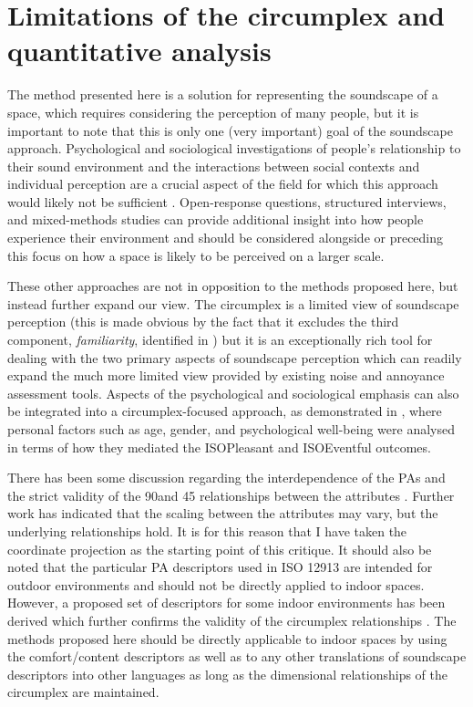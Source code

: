 \section{Limitations of the circumplex and quantitative analysis}
The method presented here is a solution for representing the soundscape of a space, which requires considering the perception of many people, but it is important to note that this is only one (very important) goal of the soundscape approach. Psychological and sociological investigations of people's relationship to their sound environment and the interactions between social contexts and individual perception are a crucial aspect of the field for which this approach would likely not be sufficient \citep{Bild2018Public}. Open-response questions, structured interviews, and mixed-methods studies can provide additional insight into how people experience their environment and should be considered alongside or preceding this focus on how a space is likely to be perceived on a larger scale.

These other approaches are not in opposition to the methods proposed here, but instead further expand our view. The circumplex is a limited view of soundscape perception (this is made obvious by the fact that it excludes the third component, \emph{familiarity}, identified in \citet{Axelsson2010principal}) but it is an exceptionally rich tool for dealing with the two primary aspects of soundscape perception which can readily expand the much more limited view provided by existing noise and annoyance assessment tools. Aspects of the psychological and sociological emphasis can also be integrated into a circumplex-focused approach, as demonstrated in \citet{Erfanian2021Psychological}, where personal factors such as age, gender, and psychological well-being were analysed in terms of how they mediated the ISOPleasant and ISOEventful outcomes.

There has been some discussion regarding the interdependence of the PAs and the strict validity of the 90\textdegree and 45 \textdegree relationships between the attributes \citep{Lionello2021Introducing}. Further work has indicated that the scaling between the attributes may vary, but the underlying relationships hold. It is for this reason that I have taken the coordinate projection as the starting point of this critique. It should also be noted that the particular PA descriptors used in ISO 12913 are intended for outdoor environments and should not be directly applied to indoor spaces. However, a proposed set of descriptors for some indoor environments has been derived which further confirms the validity of the circumplex relationships \citep{Torresin2020Indoor}. The methods proposed here should be directly applicable to indoor spaces by using the comfort/content descriptors as well as to any other translations of soundscape descriptors into other languages \citep{Aletta2020Soundscape} as long as the dimensional relationships of the circumplex are maintained.

